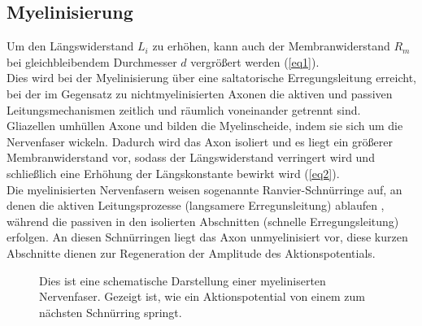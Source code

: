 \documentclass[11pt]{article}
\begin{document}
\subsection{Myelinisierung}
Um den Längswiderstand $L_i$ zu erhöhen, kann auch der Membranwiderstand $R_m$ bei gleichbleibendem Durchmesser $d$ vergrößert werden (\vref*{eq1}). \\
Dies wird bei der Myelinisierung über eine saltatorische Erregungsleitung erreicht, bei der im Gegensatz zu nichtmyelinisierten Axonen die aktiven und passiven Leitungsmechanismen zeitlich und räumlich voneinander getrennt sind. \\
Gliazellen umhüllen Axone und bilden die Myelinscheide, indem sie sich um die Nervenfaser wickeln. Dadurch wird das Axon isoliert und es liegt ein größerer Membranwiderstand vor, sodass der Längswiderstand verringert wird und schließlich eine Erhöhung der Längskonstante bewirkt wird (\vref*{eq2}). \\
Die myelinisierten Nervenfasern weisen sogenannte Ranvier-Schnürringe auf, an denen die aktiven Leitungsprozesse (langsamere Erregunsleitung) ablaufen , während die passiven in den isolierten Abschnitten (schnelle Erregungsleitung) erfolgen. An diesen Schnürringen liegt das Axon unmyelinisiert vor, diese kurzen Abschnitte dienen zur Regeneration der Amplitude des Aktionspotentials. \cite{physiologie}

\begin{figure}[H]
\caption{Dies ist eine schematische Darstellung einer myeliniserten Nervenfaser. Gezeigt ist, wie ein Aktionspotential von einem zum nächsten Schnürring \glqq springt\grqq{}. }
\label{myelin}
\end{figure}
\end{document}

